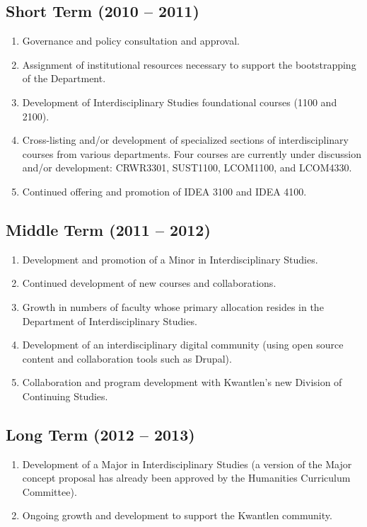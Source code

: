 \documentclass[12pt,DIV11,letterpaper,oneside,abstractoff,headsepline]{scrreprt}
\begin{document}
\subsection{Short Term (2010 -- 2011)}
\label{sec-3.1}

\begin{enumerate}
\item Governance and policy consultation and approval.
\item Assignment of institutional resources necessary to support the
     bootstrapping of the Department.
\item Development of Interdisciplinary Studies foundational courses (1100
      and 2100).
\item Cross-listing and/or development of specialized sections of
     interdisciplinary courses from various departments. Four courses
     are currently under discussion and/or development: \textsc{CRWR3301},
     \textsc{SUST1100}, \textsc{LCOM1100}, and \textsc{LCOM4330}.
\item Continued offering and promotion of IDEA 3100 and IDEA 4100.
\end{enumerate}
\subsection{Middle Term (2011 -- 2012)}
\label{sec-3.2}

\begin{enumerate}
\item Development and promotion of a Minor in Interdisciplinary Studies.
\item Continued development of new courses and collaborations.
\item Growth in numbers of faculty whose primary allocation resides in
     the Department of Interdisciplinary Studies.
\item Development of an interdisciplinary digital community (using open
     source content and collaboration tools such as Drupal).
   \item Collaboration and program development with Kwantlen's new Division of Continuing Studies.
 \end{enumerate}
\subsection{Long Term (2012 -- 2013)}
\label{sec-3.3}

\begin{enumerate}
\item Development of a Major in Interdisciplinary Studies (a version of
       the Major concept proposal has already been approved by the
       Humanities Curriculum Committee).
\item Ongoing growth and development to support the Kwantlen community.
\end{enumerate}
\end{document}
